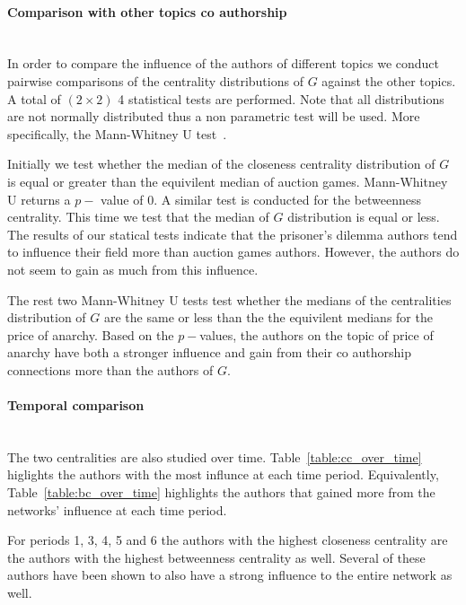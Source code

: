 \documentclass{article}
\begin{document}
\paragraph{Comparison with other topics co authorship}
\mbox{ }\\

In order to compare the influence of the authors of different topics we
conduct pairwise comparisons of the centrality distributions of \(G\)
against the other topics. A total of \((2 \times 2)\) 4 statistical tests
are performed. Note that all distributions are not normally distributed thus a
non parametric test will be used. More specifically, the Mann-Whitney U 
test~\cite{nachar2008mann}.

Initially we test whether the median of the closeness centrality distribution
of \(G\) is equal or greater than the equivilent median of auction games.
Mann-Whitney U returns a \(p-\) value of 0. A similar test is conducted for
the betweenness centrality. This time we test that the median of \(G\) distribution
is equal or less. The results of our statical tests indicate that the prisoner's
dilemma authors tend to influence their field more than auction games authors.
However, the authors do not seem to gain as much from this influence.

The rest two Mann-Whitney U tests test whether the medians of the centralities
distribution of \(G\) are the same or less than the the equivilent medians for
the price of anarchy. Based on the \(p-\)values, the authors on the topic of price of
anarchy have both a stronger influence and gain from their co authorship connections
more than the authors of \(G\).

\paragraph{Temporal comparison}
\mbox{ }\\

The two centralities are also studied over time. Table~\ref{table:cc_over_time} higlights
the authors with the most influnce at each time period. Equivalently, Table~\ref{table:bc_over_time}
highlights the authors that gained more from the networks' influence at each
time period.

For periods 1, 3, 4, 5 and 6 the authors with the highest closeness centrality
are the authors with the highest betweenness centrality as well. Several of these
authors have been shown to also have a strong influence to the entire network
as well.
\end{document}
